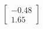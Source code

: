 \documentclass[preview]{standalone}
\begin{document}
\begin{align*}
\begin{bmatrix} -0.48 \\ 1.65 \end{bmatrix}
\end{align*}
\end{document}
